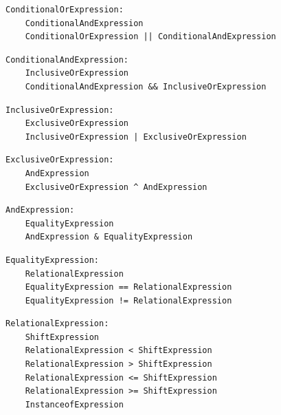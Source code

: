 \noindent\textbf{\texttt{}}\par
\begin{lstlisting}
ConditionalOrExpression:
    ConditionalAndExpression
    ConditionalOrExpression || ConditionalAndExpression
\end{lstlisting}

\noindent\textbf{\texttt{}}\par
\begin{lstlisting}
ConditionalAndExpression:
    InclusiveOrExpression
    ConditionalAndExpression && InclusiveOrExpression
\end{lstlisting}

\noindent\textbf{\texttt{}}\par
\begin{lstlisting}
InclusiveOrExpression:
    ExclusiveOrExpression
    InclusiveOrExpression | ExclusiveOrExpression
\end{lstlisting}

\noindent\textbf{\texttt{}}\par
\begin{lstlisting}
ExclusiveOrExpression:
    AndExpression
    ExclusiveOrExpression ^ AndExpression
\end{lstlisting}

\noindent\textbf{\texttt{}}\par
\begin{lstlisting}
AndExpression:
    EqualityExpression
    AndExpression & EqualityExpression
\end{lstlisting}

\noindent\textbf{\texttt{}}\par
\begin{lstlisting}
EqualityExpression:
    RelationalExpression
    EqualityExpression == RelationalExpression
    EqualityExpression != RelationalExpression
\end{lstlisting}

\noindent\textbf{\texttt{}}\par
\begin{lstlisting}
RelationalExpression:
    ShiftExpression
    RelationalExpression < ShiftExpression
    RelationalExpression > ShiftExpression
    RelationalExpression <= ShiftExpression
    RelationalExpression >= ShiftExpression
    InstanceofExpression
\end{lstlisting}

